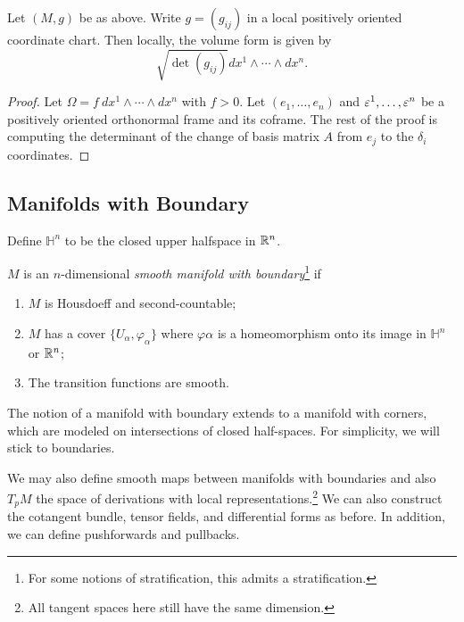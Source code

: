 \documentclass[twoside, 10pt]{article}
\begin{document}
    \begin{lem}
        Let $(M,g)$ be as above. Write $g = (g_{ij})$ in a local positively oriented coordinate chart. Then locally, the volume form is given by
        \[ \sqrt{\det(g_{ij})} dx^1 \wedge \cdots \wedge dx^n.\]
    \end{lem}

    \begin{proof}
        Let $\Omega = f\ dx^1 \wedge \cdots \wedge dx^n$ with $f > 0$. Let $(e_1, \ldots, e_n)$ and $\varepsilon^1, \ldots, \varepsilon^n$ be a positively oriented orthonormal frame and its coframe. The rest of the proof is computing the determinant of the change of basis matrix $A$ from $e_j$ to the $\delta_i$ coordinates.
    \end{proof}

    \subsection{Manifolds with Boundary}%
    \label{sub:manifolds_with_boundary}
    
    Define $\mathbb{H}^n$ to be the closed upper halfspace in $\mathbb{R}^n$.

    \begin{defn}
        $M$ is an $n$-dimensional \textit{smooth manifold with boundary}\footnote{For some notions of stratification, this admits a stratification.} if
        \begin{enumerate}
            \item $M$ is Housdoeff and second-countable;
            \item $M$ has a cover $\{U_{\alpha}, \varphi_{\alpha}\}$ where $\varphi{\alpha}$ is a homeomorphism onto its image in $\mathbb{H}^n$ or $\mathbb{R}^n$;
            \item The transition functions are smooth.
        \end{enumerate}
    \end{defn}

    The notion of a manifold with boundary extends to a manifold with corners, which are modeled on intersections of closed half-spaces. For simplicity, we will stick to boundaries.

    We may also define smooth maps between manifolds with boundaries and also $T_pM$ the space of derivations with local representations.\footnote{All tangent spaces here still have the same dimension.} We can also construct the cotangent bundle, tensor fields, and differential forms as before. In addition, we can define pushforwards and pullbacks.
\end{document}
